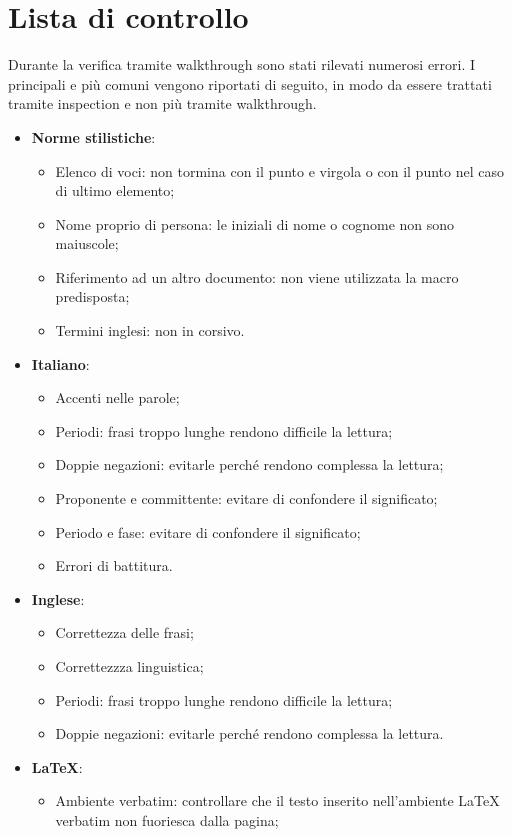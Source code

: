 \newpage
\section{Lista di controllo}
Durante la verifica tramite walkthrough sono stati rilevati numerosi errori. I principali e più comuni vengono riportati di seguito, in modo da essere trattati tramite inspection e non più tramite walkthrough.
\begin{itemize}
\item \textbf{Norme stilistiche}:
	\begin{itemize}
	\item Elenco di voci: non tormina con il punto e virgola o con il punto nel caso di ultimo elemento;
	\item Nome proprio di persona: le iniziali di nome o cognome non sono maiuscole;
	\item Riferimento ad un altro documento: non viene utilizzata la macro predisposta;
	\item Termini inglesi: non in corsivo.
	\end{itemize}
\item \textbf{Italiano}:
	\begin{itemize}
	\item Accenti nelle parole;
	\item Periodi: frasi troppo lunghe rendono difficile la lettura;
	\item Doppie negazioni: evitarle perché rendono complessa la lettura;
	\item Proponente e committente: evitare di confondere il significato;
	\item Periodo e fase: evitare di confondere il significato;
	\item Errori di battitura.
	\end{itemize}
\item \textbf{Inglese}:
	\begin{itemize}
	\item Correttezza delle frasi;
	\item Correttezzza linguistica;
	\item Periodi: frasi troppo lunghe rendono difficile la lettura;
	\item Doppie negazioni: evitarle perché rendono complessa la lettura.
	\end{itemize}
\item \textbf{\LaTeX}:
	\begin{itemize}
	\item Ambiente verbatim: controllare che il testo inserito nell'ambiente \LaTeX{} verbatim non fuoriesca dalla pagina;

\end{itemize}
\end{itemize}
